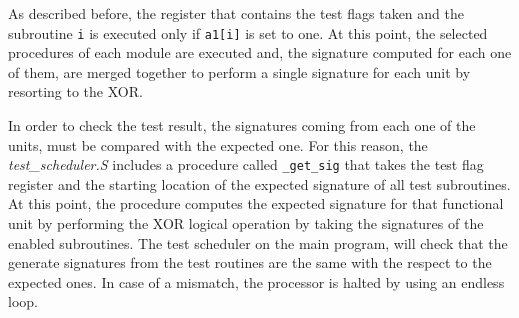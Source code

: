 \documentclass[paper=a4, fontsize=10pt]{scrartcl}	%
\begin{document}
	As described before, the register that contains the test flags taken and the subroutine \texttt{i} is executed only if \texttt{a1[i]} is set to one. At this point, the selected procedures of each module are executed and, the signature computed for each one of them, are merged together to perform a single signature for each unit by resorting to the XOR. 
	
	In order to check the test result, the signatures coming from each one of the units, must be compared with the expected one. For this reason, the \textit{test\_scheduler.S} includes a procedure called \texttt{\_get\_sig} that takes the test flag register and the starting location of the expected signature of all test subroutines. At this point, the procedure computes the expected signature for that functional unit by performing the XOR logical operation by taking the signatures of the enabled subroutines. The test scheduler on the main program, will check that the generate signatures from the test routines are the same with the respect to the expected ones. In case of a mismatch, the processor is halted by using an endless loop.
\end{document}
